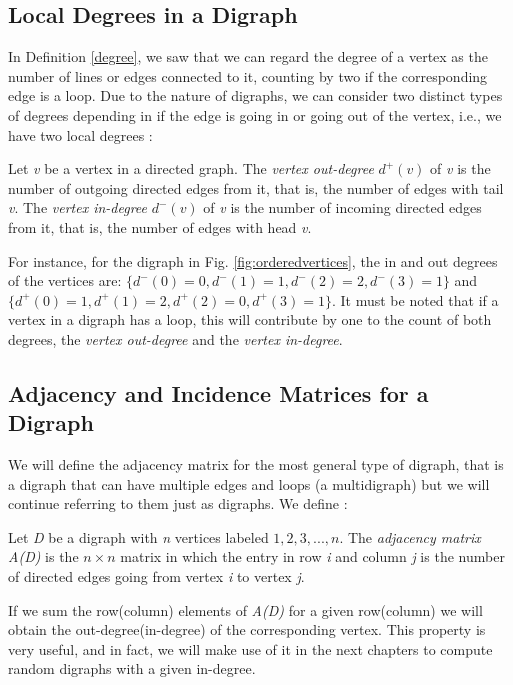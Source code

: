 \subsection{Local Degrees in a Digraph}
In Definition \ref{degree}, we saw that we can regard the degree of a vertex as the number of lines or edges connected to it, counting by two if the corresponding edge is a loop.
Due to the nature of digraphs, we can consider two distinct types of degrees depending in if the edge is going in or going out of the vertex, i.e., we have two local degrees \cite{douglas}:

\begin{defn}
	Let \textit{v} be a vertex in a directed graph. The \textit{vertex out-degree} $ d^{+} (v) $ of \textit{v} is the number of outgoing directed edges from it, that is, the number of edges with tail \textit{v}. The \textit{vertex in-degree} $ d^{-} (v) $ of \textit{v} is the number of incoming directed edges from it, that is, the number of edges with head \textit{v}.
\end{defn}

For instance, for the digraph in Fig. \ref{fig:orderedvertices}, the in and out degrees of the vertices are: $ \{ d^{-} (0)=0 ,  d^{-} (1)=1 , d^{-} (2)=2 , d^{-} (3)=1 \} $ and $ \{ d^{+} (0)=1 ,  d^{+} (1)=2 , d^{+} (2)= 0, d^{+} (3)=1 \} $.
It must be noted that if a vertex in a digraph has a loop, this will contribute by one to the count of both degrees, the \textit{vertex out-degree} and the \textit{vertex in-degree}.

\subsection{Adjacency and Incidence Matrices for a Digraph}
We will define the adjacency matrix for the most general type of digraph, that is a digraph that can have multiple edges and loops (a multidigraph) but we will continue referring to them just as digraphs. We define \cite{wilsonwatkins}:

\begin{defn}
	Let \textit{D} be a digraph with \textit{n} vertices labeled $1,2,3,...,n$. The \textit{adjacency matrix A(D)} is the $n \times n$ matrix in which the entry in row \textit{i} and column \textit{j} is the number of directed edges going from vertex \textit{i} to vertex \textit{j}. 
\end{defn}

If we sum the row(column) elements of \textit{A(D)} for a given row(column) we will obtain the out-degree(in-degree) of the corresponding vertex. This property is very useful, and in fact, we will make use of it in the next chapters to compute random digraphs with a given in-degree.\\

